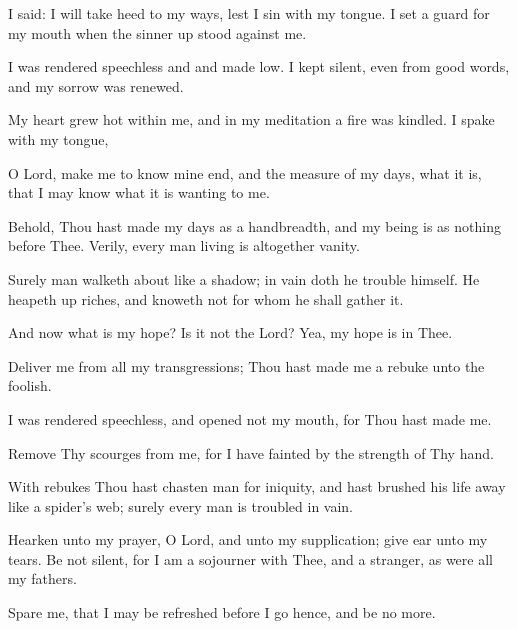 I said: I will take heed to my ways, lest I sin with my tongue. I set a guard for my mouth when the sinner up stood against me.

I was rendered speechless and and made low. I kept silent, even from good words, and my sorrow was renewed.

My heart grew hot within me, and in my meditation a fire was kindled. I spake with my tongue,

O Lord, make me to know mine end, and the measure of my days, what it is, that I may know what it is wanting to me.

Behold, Thou hast made my days as a handbreadth, and my being is as nothing before Thee. Verily, every man living is altogether vanity.

Surely man walketh about like a shadow; in vain doth he trouble himself. He heapeth up riches, and knoweth not for whom he shall gather it.

And now what is my hope? Is it not the Lord? Yea, my hope is in Thee.

Deliver me from all my transgressions; Thou hast made me a rebuke unto the foolish.

I was rendered speechless, and opened not my mouth, for Thou hast made me.

Remove Thy scourges from me, for I have fainted by the strength of Thy hand.

With rebukes Thou hast chasten man for iniquity, and hast brushed his life away like a spider's web; surely every man is troubled in vain.

Hearken unto my prayer, O Lord, and unto my supplication; give ear unto my tears. Be not silent, for I am a sojourner with Thee, and a stranger, as were all my fathers.

Spare me, that I may be refreshed before I go hence, and be no more.
